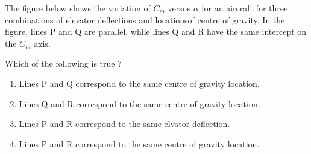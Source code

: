 	\item The figure below shows the variation of $C_m$ versus $\alpha$ for an aircraft for three combinations of elevator deflections and locationsof centre of gravity. In the figure, lines P and Q are parallel, while lines Q and R have the same intercept on the $C_m$ axis.
		Which of the following is true ?
		\begin{enumerate}
			\item Lines P and Q correspond to the same centre of gravity location.
			\item Lines Q and R correspond to the same centre of gravity location.
			\item Lines P and R correspond to the same elvator deflection.
			\item Lines P and R correspond to the same centre of gravity location.
		\end{enumerate}


